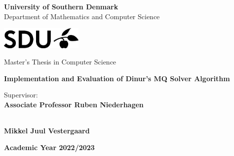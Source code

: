 \begin{center}
{\LARGE \textbf{University of Southern Denmark}} \\
\vspace{0.2cm}
{\Large {Department of Mathematics and Computer Science}} \\ 
\vspace{1cm}

\includegraphics[width=4cm]{figures/SDU-no-title.png} \\
\vspace{1cm}

{\Large {Master's Thesis in Computer Science}} \\
\vspace{6cm}

{\LARGE \textbf{Implementation and Evaluation of Dinur's MQ Solver Algorithm}} \\ 
\vspace{1cm}

\end{center}

\begin{multicols}{2}
\noindent \large{Supervisor:} \\
\large{\textbf{Associate Professor Ruben Niederhagen}} \\
\columnbreak

 \\
\large{\textbf{Mikkel Juul Vestergaard}} \\
\end{multicols}
\vspace{4cm}

\begin{center}
    \large{\textbf{Academic Year 2022/2023}}
\end{center}



